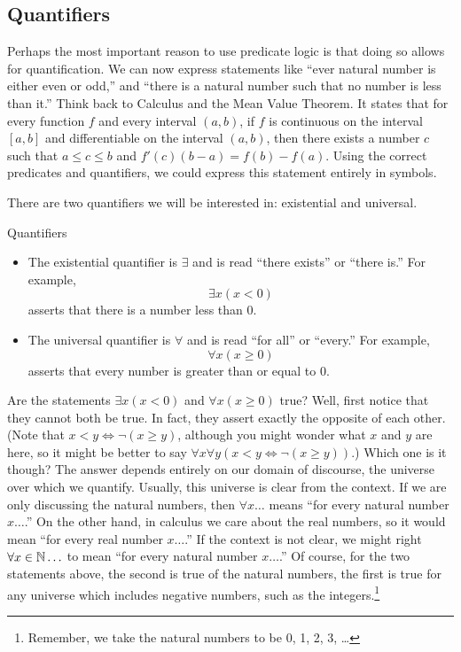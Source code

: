 \documentclass[12pt]{article}
\begin{document}
\subsection{Quantifiers}

Perhaps the most important reason to use predicate logic is that doing so allows for quantification.  We can now express statements like ``ever natural number is either even or odd,'' and ``there is a natural number such that no number is less than it.''  Think back to Calculus and the Mean Value Theorem.  It states that for every function $f$ and every interval $(a, b)$, if $f$ is continuous on the interval $[a,b]$ and differentiable on the interval $(a,b)$, then there exists a number $c$ such that $a \le c \le b$ and $f'(c)(b - a) = f(b) - f(a)$.  Using the correct predicates and quantifiers, we could express this statement entirely in symbols.  

There are two quantifiers we will be interested in: existential and universal.  

\begin{defbox}{Quantifiers}
  \begin{itemize}
    \item The existential quantifier is $\exists$ and is read ``there exists'' or ``there is.''  For example,
\[\exists x (x < 0)\]
asserts that there is a number less than 0.
\item The universal quantifier is $\forall$ and is read ``for all'' or ``every.''  For example,
\[\forall x (x \ge 0)\]
asserts that every number is greater than or equal to 0.
  \end{itemize}    
\end{defbox}

  Are the statements $\exists x (x < 0)$ and $\forall x (x \ge 0)$ true?  Well, first notice that they cannot both be true.  In fact, they assert exactly the opposite of each other.  (Note that $x < y \iff \neg(x \ge y)$, although you might wonder what $x$ and $y$ are here, so it might be better to say $\forall x \forall y\left(x < y \iff \neg(x \ge y)\right)$.)  Which one is it though?  The answer depends entirely on our domain of discourse, the universe over which we quantify.  Usually, this universe is clear from the context.  If we are only discussing the natural numbers, then $\forall x \ldots$ means ``for every natural number $x \ldots$.''  On the other hand, in calculus we care about the real numbers, so it would mean ``for every real number $x \ldots$.''  If the context is not clear, we might right $\forall x \in \mathbb N\ldots$ to mean ``for every natural number $x\ldots$.''  Of course, for the two statements above, the second is true of the natural numbers, the first is true for any universe which includes negative numbers, such as the integers.\footnote{Remember, we take the natural 
numbers to be 0, 1, 2, 3, \ldots}
\end{document}
